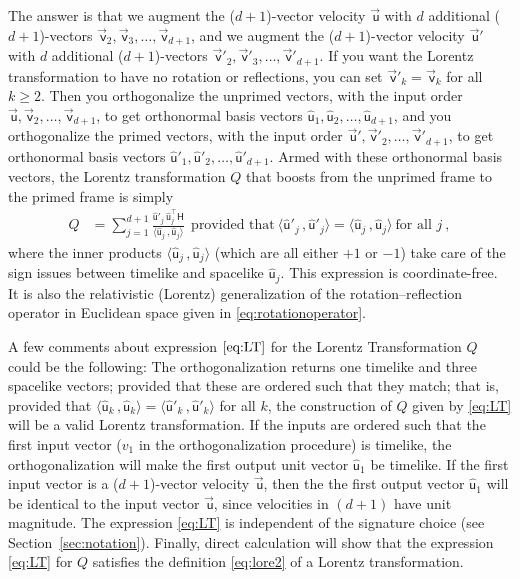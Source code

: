 \documentclass{article}
\newcommand{\metric}{\mathsf{H}}
\newcommand\upvec[1]{\!\vec{\,\mathrm{#1}}}
\newcommand{\Lvec}[1]{\upvec{\mathsf{#1}}} %
\newcommand{\Lhat}[1]{\hat{\mathsf{#1}}} %
\newcommand{\inner}[2]{\langle{#1}\,,{#2}\rangle}
\newcommand{\plus}{\!+\!} %
\newcommand{\secref}[1]{Section~\ref{#1}}
\begin{document}
The answer is that we augment the ($d\plus1$)-vector velocity $\Lvec{u}$ with $d$ additional ($d\plus1$)-vectors $\Lvec{v}_2,\Lvec{v}_3,\ldots,\Lvec{v}_{d+1}$, and we augment the ($d\plus1$)-vector velocity $\Lvec{u}'$ with $d$ additional ($d\plus1$)-vectors $\Lvec{v}'_2,\Lvec{v}'_3,\ldots,\Lvec{v}'_{d+1}$.
If you want the Lorentz transformation to have no rotation or reflections, you can set $\Lvec{v}'_k=\Lvec{v}_k$ for all $k\geq 2$.
Then you orthogonalize the unprimed vectors, with the input order $\Lvec{u},\Lvec{v}_2,\ldots,\Lvec{v}_{d+1}$, to get orthonormal basis vectors $\Lhat{u}_1,\Lhat{u}_2,\ldots,\Lhat{u}_{d+1}$, and you orthogonalize the primed vectors, with the input order $\Lvec{u}',\Lvec{v}'_2,\ldots,\Lvec{v}'_{d+1}$, to get orthonormal basis vectors $\Lhat{u}'_1,\Lhat{u}'_2,\ldots,\Lhat{u}'_{d+1}$.
Armed with these orthonormal basis vectors, the Lorentz transformation $Q$ that boosts from the unprimed frame to the primed frame is simply
\begin{align}
    Q &= \sum_{j=1}^{d+1} \frac{\Lhat{u}'_j\,\Lhat{u}_j^\top\metric}{\inner{\Lhat{u}_j}{\Lhat{u}_j}} ~~ \mbox{provided that} ~ \inner{\Lhat{u}'_j}{\Lhat{u}'_j} = \inner{\Lhat{u}_j}{\Lhat{u}_j} ~ \mbox{for all $j$} ~,\label{eq:LT}
\end{align}
where the inner products $\inner{\Lhat{u}_j}{\Lhat{u}_j}$ (which are all either $+1$ or $-1$) take care of the sign issues between timelike and spacelike $\Lhat{u}_j$.
This expression is coordinate-free.
It is also the relativistic (Lorentz) generalization of the rotation--reflection operator in Euclidean space given in \eqref{eq:rotationoperator}.

A few comments about expression $\eqref{eq:LT}$ for the Lorentz Transformation $Q$ could be the following:
The orthogonalization returns one timelike and three spacelike vectors;
provided that these are ordered such that they match; that is, provided that $\inner{\Lhat{u}_k}{\Lhat{u}_k}=\inner{\Lhat{u}'_k}{\Lhat{u}'_k}$ for all $k$, the construction of $Q$ given by \eqref{eq:LT} will be a valid Lorentz transformation.
If the inputs are ordered such that the first input vector ($v_1$ in the orthogonalization procedure) is timelike, the orthogonalization will make the first output unit vector $\Lhat{u}_1$ be timelike.
If the first input vector is a ($d\plus1$)-vector velocity $\Lvec{u}$, then the the first output vector $\Lhat{u}_1$ will be identical to the input vector $\Lvec{u}$, since velocities in $(d\plus1)$ have unit magnitude.
The expression \eqref{eq:LT} is independent of the signature choice (see \secref{sec:notation}).
Finally, direct calculation will show that the expression \eqref{eq:LT} for $Q$ satisfies the definition \eqref{eq:lore2} of a Lorentz transformation.
\end{document}
